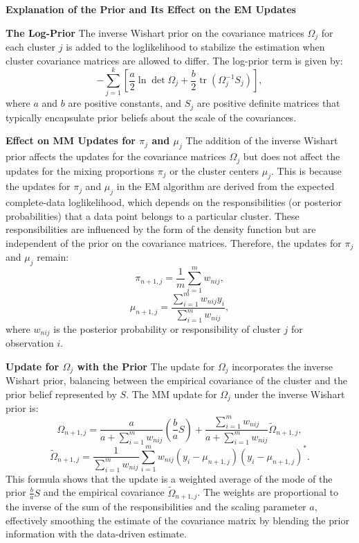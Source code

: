 \documentclass[8pt]{article}
\begin{document}
{\textbf{Explanation of the Prior and Its Effect on the EM Updates}

\textbf{The Log-Prior}
The inverse Wishart prior on the covariance matrices \(\Omega_j\) for each cluster \(j\) is added to the loglikelihood to stabilize the estimation when cluster covariance matrices are allowed to differ. The log-prior term is given by:
\[
- \sum_{j=1}^{k} \left[ \frac{a}{2} \ln \det \Omega_j + \frac{b}{2} \operatorname{tr}(\Omega_j^{-1} S_j) \right],
\]
where \(a\) and \(b\) are positive constants, and \(S_j\) are positive definite matrices that typically encapsulate prior beliefs about the scale of the covariances.

\textbf{Effect on MM Updates for \(\pi_j\) and \(\mu_j\)}
The addition of the inverse Wishart prior affects the updates for the covariance matrices \(\Omega_j\) but does not affect the updates for the mixing proportions \(\pi_j\) or the cluster centers \(\mu_j\). This is because the updates for \(\pi_j\) and \(\mu_j\) in the EM algorithm are derived from the expected complete-data loglikelihood, which depends on the responsibilities (or posterior probabilities) that a data point belongs to a particular cluster. These responsibilities are influenced by the form of the density function but are independent of the prior on the covariance matrices. Therefore, the updates for \(\pi_j\) and \(\mu_j\) remain:
\[
\pi_{n+1,j} = \frac{1}{m} \sum_{i=1}^m w_{nij},
\]
\[
\mu_{n+1,j} = \frac{\sum_{i=1}^m w_{nij} y_i}{\sum_{i=1}^m w_{nij}},
\]
where \(w_{nij}\) is the posterior probability or responsibility of cluster \(j\) for observation \(i\).

\textbf{Update for \(\Omega_j\) with the Prior}
The update for \(\Omega_j\) incorporates the inverse Wishart prior, balancing between the empirical covariance of the cluster and the prior belief represented by \(S\). The MM update for \(\Omega_j\) under the inverse Wishart prior is:
\[
\Omega_{n+1,j} = \frac{a}{a + \sum_{i=1}^{m} w_{nij}} \left( \frac{b}{a} S \right) + \frac{\sum_{i=1}^{m} w_{nij}}{a + \sum_{i=1}^{m} w_{nij}} \tilde{\Omega}_{n+1,j},
\]
\[
\tilde{\Omega}_{n+1,j} = \frac{1}{\sum_{i=1}^{m} w_{nij}} \sum_{i=1}^{m} w_{nij} (y_i - \mu_{n+1,j})(y_i - \mu_{n+1,j})^*.
\]
This formula shows that the update is a weighted average of the mode of the prior \(\frac{b}{a} S\) and the empirical covariance \(\tilde{\Omega}_{n+1,j}\). The weights are proportional to the inverse of the sum of the responsibilities and the scaling parameter \(a\), effectively smoothing the estimate of the covariance matrix by blending the prior information with the data-driven estimate.

}
\end{document}
